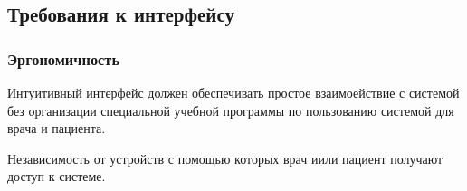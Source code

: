 \subsection{Требования к интерфейсу}
\subsubsection{Эргономичность}

Интуитивный интерфейс должен обеспечивать простое взаимоействие с системой без
организации специальной учебной программы по пользованию системой для врача и
пациента. 

Независимость от устройств с помощью которых врач иили пациент получают
доступ к системе.
